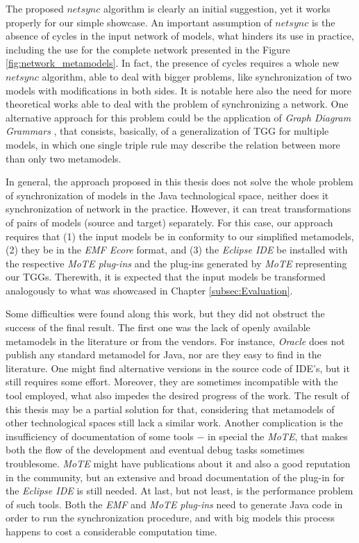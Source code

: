 \documentclass[tuberlin,cic,tc,english,noabntcite,oneside]{iiufrgs}
\begin{document}
The proposed $netsync$ algorithm is clearly an initial suggestion, yet it works properly for our simple showcase. An important assumption of $netsync$ is the absence of cycles in the input network of models, what hinders its use in practice, including the use for the complete network presented in the Figure \ref{fig:network_metamodels}. In fact, the presence of cycles requires a whole new $netsync$ algorithm, able to deal with bigger problems, like synchronization of two models with modifications in both sides. It is notable here also the need for more theoretical works able to deal with the problem of synchronizing a network. One alternative approach for this problem could be the application of \emph{Graph Diagram Grammars} \citep{trollmann2015extending}, that consists, basically, of a generalization of TGG for multiple models, in which one single triple rule may describe the relation between more than only two metamodels.

In general, the approach proposed in this thesis does not solve the whole problem of synchronization of models in the Java technological space, neither does it synchronization of network in the practice. However, it can treat transformations of pairs of models (source and target) separately. For this case, our approach requires that (1) the input models be in conformity to our simplified metamodels, (2) they be in the \emph{EMF Ecore} format, and (3) the \emph{Eclipse IDE} be installed with the respective \emph{MoTE plug-ins} and the plug-ins generated by \emph{MoTE} representing our TGGs. Therewith, it is expected that the input models be transformed analogously to what was showcased in Chapter \ref{subsec:Evaluation}.

Some difficulties were found along this work, but they did not obstruct the success of the final result. The first one was the lack of openly available metamodels in the literature or from the vendors. For instance, \emph{Oracle} does not publish any standard metamodel for Java, nor are they easy to find in the literature. One might find alternative versions in the source code of IDE's, but it still requires some effort. Moreover, they are sometimes incompatible with the tool employed, what also impedes the desired progress of the work. The result of this thesis may be a partial solution for that, considering that metamodels of other technological spaces still lack a similar work. Another complication is the insufficiency of documentation of some tools $-$ in special the \emph{MoTE}, that makes both the flow of the development and eventual debug tasks sometimes troublesome. \emph{MoTE} might have publications about it and also a good reputation in the community, but an extensive and broad documentation of the plug-in for the \emph{Eclipse IDE} is still needed. At last, but not least, is the performance problem of such tools. Both the \emph{EMF} and \emph{MoTE} \emph{plug-ins} need to generate Java code in order to run the synchronization procedure, and with big models this process happens to cost a considerable computation time.
\end{document}
